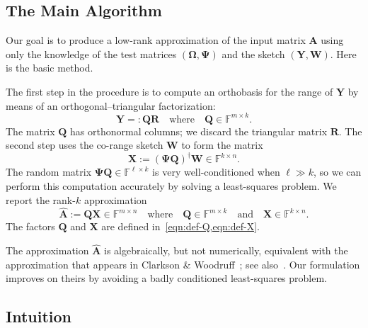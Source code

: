 \documentclass[final]{siamart1116}
\numberwithin{equation}{section}
\numberwithin{theorem}{section}
\numberwithin{figure}{section}
\newcommand{\F}{\mathbb{F}}
\newcommand{\mtx}[1]{\bm{#1}}
\begin{document}
\subsection{The Main Algorithm}

Our goal is to produce a low-rank approximation of the input matrix $\mtx{A}$
using only the knowledge of the test matrices $(\mtx{\Omega}, \mtx{\Psi})$
and the sketch $(\mtx{Y}, \mtx{W})$.  Here is the basic method.

The first step in the procedure is to compute an orthobasis for the range of $\mtx{Y}$ by means of an orthogonal--triangular factorization:
\begin{equation} \label{eqn:def-Q}
\mtx{Y} =: \mtx{QR}
\quad\text{where}\quad
\mtx{Q} \in \F^{m \times k}.
\end{equation}
The matrix $\mtx{Q}$ has orthonormal columns; we discard the triangular matrix $\mtx{R}$.
The second step uses the co-range sketch $\mtx{W}$ to form the matrix
\begin{equation} \label{eqn:def-X}
\mtx{X} := (\mtx{\Psi} \mtx{Q})^{\dagger} \mtx{W} \in \F^{k \times n}.
\end{equation}
The random matrix $\mtx{\Psi} \mtx{Q} \in \F^{\ell \times k}$
is very well-conditioned when $\ell \gg k$, so we can perform
this computation accurately by solving a least-squares problem.
We report the rank-$k$ approximation
\begin{equation} \label{eqn:Ahat}
\hat{\mtx{A}} := \mtx{QX} \in \F^{m \times n}
\quad\text{where}\quad
\mtx{Q} \in \F^{m \times k}
\quad\text{and}\quad
\mtx{X} \in \F^{k \times n}.
\end{equation}
The factors $\mtx{Q}$ and $\mtx{X}$ are defined in~\cref{eqn:def-Q,eqn:def-X}.

\begin{remark}
The approximation $\hat{\mtx{A}}$ is algebraically, but not numerically,
equivalent with the approximation that appears in
Clarkson \& Woodruff~\cite[Thm.~4.7]{CW09:Numerical-Linear};
see also~\cite[Thm.~4.3, display 1]{Woo14:Sketching-Tool}.
Our formulation improves on theirs by avoiding
a badly conditioned least-squares problem.
\end{remark}












\subsection{Intuition} \label{sec:intuition}
\end{document}
